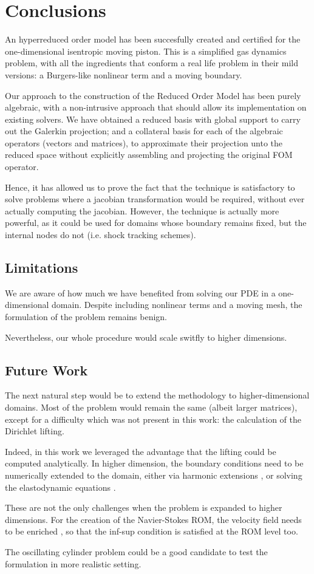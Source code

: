 \documentclass[thesis.tex]{subfiles}
\begin{document}
\section{Conclusions}
An hyperreduced order model has been succesfully created and certified for
the one-dimensional isentropic moving piston.
This is a simplified gas dynamics problem, 
with all the ingredients that conform a real life problem in their mild versions:
a Burgers-like nonlinear term and a moving boundary.

Our approach to the construction of the Reduced Order Model has been purely algebraic, 
with a non-intrusive approach that should allow its implementation on existing solvers.
We have obtained a reduced basis with global support to carry out the Galerkin projection;
and a collateral basis for each of the algebraic operators (vectors and matrices),
to approximate their projection unto the reduced space 
without explicitly assembling and projecting the original FOM operator.

Hence, it has allowed us to prove the fact that the technique is satisfactory
to solve problems where a jacobian transformation would be required,
without ever actually computing the jacobian. 
However, the technique is actually more powerful, 
as it could be used for domains whose boundary remains fixed,
but the internal nodes do not (i.e. shock tracking schemes).

\subsection{Limitations}
We are aware of how much we have benefited from solving our PDE in a one-dimensional domain.
Despite including nonlinear terms and a moving mesh,
the formulation of the problem remains benign. 

Nevertheless, our whole procedure would scale switfly to higher dimensions.

\subsection{Future Work}
The next natural step would be to extend the methodology to higher-dimensional domains.
Most of the problem would remain the same (albeit larger matrices), 
except for a difficulty which was not present in this work: 
the calculation of the Dirichlet lifting. 

Indeed, in this work we leveraged the advantage that the lifting could be computed analytically.
In higher dimension, the boundary conditions need to be numerically extended to the domain,
either via harmonic extensions
\cite{formaggiaALE},
or solving the elastodynamic equations
\cite{1995_farhat_elasticEquations}.

These are not the only challenges when the problem is expanded to higher dimensions.
For the creation of the Navier-Stokes ROM, the velocity field needs to be enriched
\cite{supremizers},
so that the inf-sup condition is satisfied at the ROM level too.

The oscillating cylinder problem could be a good candidate 
to test the formulation in more realistic setting.
\end{document}
